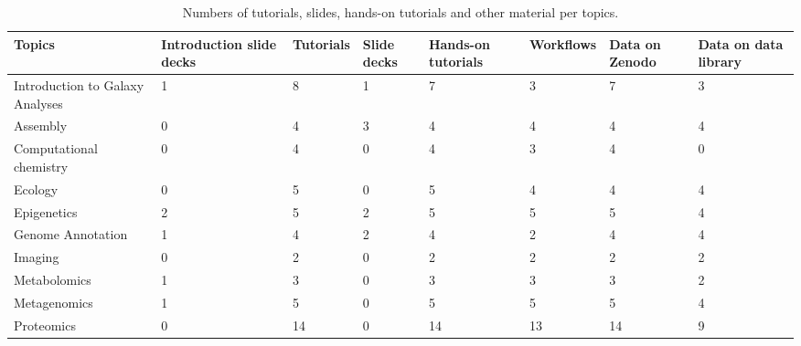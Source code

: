 \documentclass[10pt,letterpaper]{article}
\begin{document}
\begin{table}[]
\begin{adjustwidth}{-2.25in}{0in} %
	\centering
	\caption{Numbers of tutorials, slides, hands-on tutorials and other material per topics. \label{tbl:numberOfMaterials}}
	\begin{tabular}{p{2in}|p{0.8in}llp{0.8in}lll}
		Topics                                       & Introduction slide decks & Tutorials & Slide decks & Hands-on tutorials & Workflows & Data on Zenodo & Data on data library\\\hline
		Introduction to Galaxy Analyses              & 1                        & 8         & 1           & 7                  & 3         & 7              & 3\\
		Assembly                                     & 0                        & 4         & 3           & 4                  & 4         & 4              & 4\\
		Computational chemistry                      & 0                        & 4         & 0           & 4                  & 3         & 4              & 0\\
		Ecology                                      & 0                        & 5         & 0           & 5                  & 4         & 4              & 4\\
		Epigenetics                                  & 2                        & 5         & 2           & 5                  & 5         & 5              & 4\\
		Genome Annotation                            & 1                        & 4         & 2           & 4                  & 2         & 4              & 4\\
		Imaging                                      & 0                        & 2         & 0           & 2                  & 2         & 2              & 2\\
		Metabolomics                                 & 1                        & 3         & 0           & 3                  & 3         & 3              & 2\\
		Metagenomics                                 & 1                        & 5         & 0           & 5                  & 5         & 5              & 4\\
		Proteomics                                   & 0                        & 14        & 0           & 14                 & 13        & 14             & 9\\

\end{tabular}
\end{adjustwidth}
\end{table}
\end{document}
